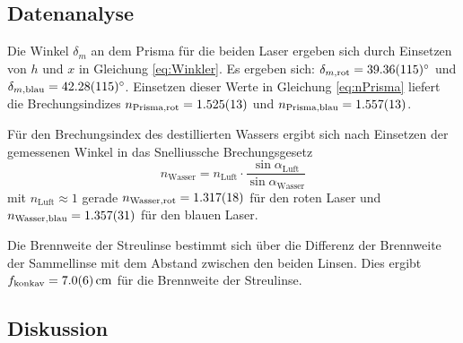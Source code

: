 	\subsection{Datenanalyse}
		
		Die Winkel $\delta_m$ an dem Prisma für die beiden Laser ergeben sich durch Einsetzen von $h$ und $x$ in Gleichung \ref{eq:Winkler}.
		Es ergeben sich: $\delta_{m,\text{rot}} = \SI{39,36+-1,15}{\degree}$ und $\delta_{m,\text{blau}} = \SI{42,28+-1,15}{\degree}$.
		Einsetzen dieser Werte in Gleichung \ref{eq:nPrisma} liefert die Brechungsindizes $n_\text{Prisma,rot} = \SI{1.525+-0.013}{}$ und $n_\text{Prisma,blau} = \SI{1.557+-0.013}{}$.
		
		Für den Brechungsindex des destillierten Wassers ergibt sich nach Einsetzen der gemessenen Winkel in das Snelliussche Brechungsgesetz
		\begin{equation}
			n_\text{Wasser} = n_\text{Luft} \cdot \frac{\sin \alpha_\text{Luft}}{\sin \alpha_\text{Wasser}} 
		\end{equation}
		mit $n_\text{Luft} \approx 1$ gerade $n_\text{Wasser,rot} = \SI{1.317+-0.018}{}$ für den roten Laser und $n_\text{Wasser,blau} = \SI{1.357+-0.031}{}$ für den blauen Laser.  
		
		Die Brennweite der Streulinse bestimmt sich über die Differenz der Brennweite der Sammellinse mit dem Abstand zwischen den beiden Linsen.
		Dies ergibt $f_\text{konkav} = \SI{7+-0,6}{\centi\meter}$ für die Brennweite der Streulinse.
		
	\subsection{Diskussion}
		
